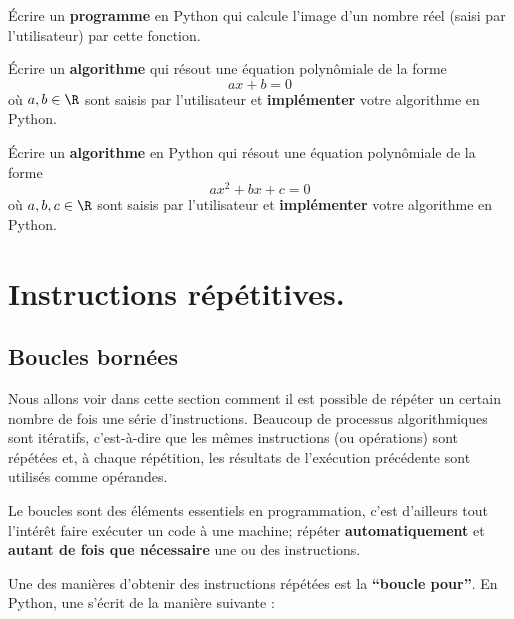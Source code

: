 \begin{boxexstheorieligne}
Écrire un \textbf{programme} en Python qui calcule l'image d'un nombre réel (saisi par l'utilisateur) par cette fonction.




\eexo




\exo
Écrire un \textbf{algorithme} qui résout une équation polynômiale de la forme $$ax+b=0$$ où $a, b \in \R$ sont saisis par l'utilisateur et \textbf{implémenter} votre algorithme en Python.




\eexo




\exo
Écrire un \textbf{algorithme} en Python qui résout une équation polynômiale de la forme $$ax^2+bx+c=0$$ où $a, b, c \in \R$ sont saisis par l'utilisateur et \textbf{implémenter} votre algorithme en Python.
\end{boxexstheorieligne}
\vspace{2mm}
\clearpage





\section{Instructions répétitives.}%
\subsection{Boucles bornées}
\newcommand{\boup}{\guillemets{boucle pour} }
Nous allons voir dans cette section comment il est possible de répéter un certain nombre de fois une série d'instructions. Beaucoup de processus algorithmiques sont itératifs, c'est-à-dire que les mêmes instructions (ou opérations) sont répétées et, à chaque répétition, les résultats de l'exécution précédente sont utilisés comme opérandes.

\medskip
Le boucles sont des éléments essentiels en programmation, c'est d'ailleurs tout l'intérêt faire exécuter un code à une machine; répéter \textbf{automatiquement} et \textbf{autant de fois que nécessaire} une ou des instructions.


\medskip
Une des manières d'obtenir des instructions répétées est la \textbf{``boucle pour''}. En Python, une  s'écrit de la manière suivante :  


